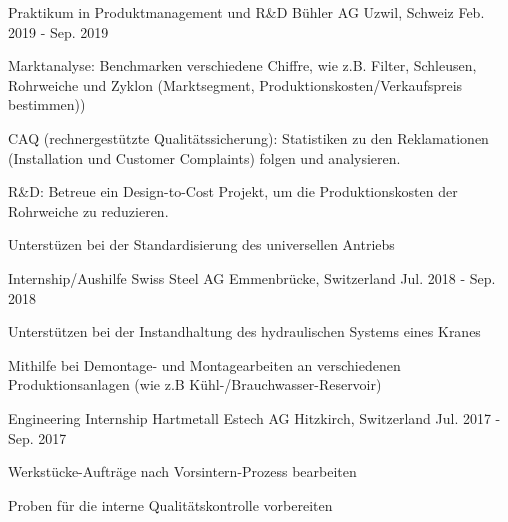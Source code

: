 

\begin{cventries}

\cventry
	{Praktikum in Produktmanagement und R\&D} %
	{Bühler AG} %
	{Uzwil, Schweiz} %
	{Feb. 2019 - Sep. 2019} %
	{
		\begin{cvitems} %
			\item {Marktanalyse: Benchmarken verschiedene Chiffre, wie z.B. Filter, Schleusen, Rohrweiche und Zyklon (Marktsegment, Produktionskosten/Verkaufspreis bestimmen))}
			\item {CAQ (rechnergestützte Qualitätssicherung): Statistiken zu den Reklamationen (Installation und Customer Complaints) folgen und analysieren.}
			\item {R\&D: Betreue ein Design-to-Cost Projekt, um die Produktionskosten der Rohrweiche zu reduzieren.}
			\item {Unterstüzen bei der Standardisierung des universellen Antriebs}
		\end{cvitems}
}	


\cventry
	{Internship/Aushilfe} %
	{Swiss Steel AG} %
	{Emmenbrücke, Switzerland} %
	{Jul. 2018 - Sep. 2018} %
	{
		\begin{cvitems} %
			\item {Unterstützen bei der Instandhaltung des hydraulischen Systems eines Kranes}
			\item {Mithilfe bei Demontage- und Montagearbeiten an verschiedenen Produktionsanlagen (wie z.B Kühl-/Brauchwasser-Reservoir)}
		\end{cvitems}
}	

\cventry
	{Engineering Internship} %
	{Hartmetall Estech AG} %
	{Hitzkirch, Switzerland} %
	{Jul. 2017 - Sep. 2017} %
	{
		\begin{cvitems} %
			\item {Werkstücke-Aufträge nach Vorsintern-Prozess bearbeiten}
			\item {Proben für die interne Qualitätskontrolle vorbereiten}
		\end{cvitems}
}


\end{cventries}
